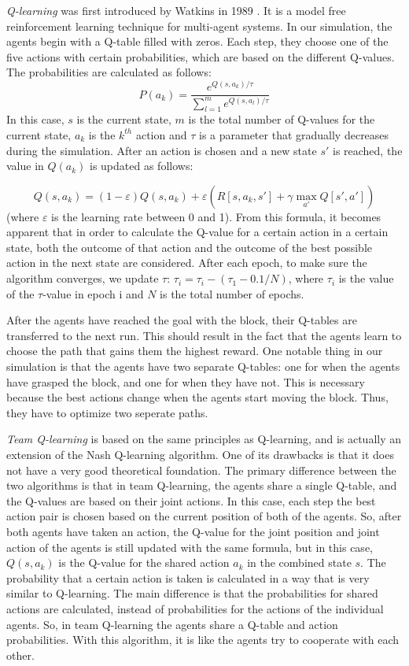 \textit{Q-learning} was first introduced by Watkins in 1989 \cite{watkins1989}. It is a model free reinforcement learning technique for multi-agent systems. In our simulation, the agents begin with a Q-table filled with zeros. Each step, they choose one of the five actions with certain probabilities, which are based on the different Q-values. The probabilities are calculated as follows: 
\begin{equation}
	P(a_{k})=\frac{e^{Q(s,a_{k})/ \tau}}{\sum_{l=1}^{m}e^{Q(s,a_{l})/ \tau}}
\end{equation}
In this case, $s$ is the current state, $m$ is the total number of Q-values for the current state, $a_{k}$ is the $k^{th}$ action and $\tau$ is a parameter that gradually decreases during the simulation. After an action is chosen and a new state $s'$ is reached, the value in $Q(a_{k})$ is updated as follows: 

\begin{equation}
	Q(s,a_{k}) = (1- \varepsilon) Q(s,a_{k})+ \varepsilon (R [s, a_k, s'] + \gamma \max_{a'} Q[s', a'])
\end{equation}
(where $\varepsilon$ is the learning rate between 0 and 1). From this formula, it becomes apparent that in order to calculate the Q-value for a certain action in a certain state, both the outcome of that action and the outcome of the best possible action in the next state are considered. After each epoch, to make sure the algorithm converges, we update $\tau$: $\tau_{i} = \tau_{i}-(\tau_{1}-0.1/N)$, where $\tau_{i}$ is the value of the $\tau$-value in epoch i and $N$ is the total number of epochs.

After the agents have reached the goal with the block, their Q-tables are transferred to the next run. This should result in the fact that the agents learn to choose the path that gains them the highest reward. One notable thing in our simulation is that the agents have two separate Q-tables: one for when the agents have grasped the block, and one for when they have not. This is necessary because the best actions change when the agents start moving the block. Thus, they have to optimize two seperate paths.

\textit{Team Q-learning} is based on the same principles as Q-learning, and is actually an extension of the Nash Q-learning algorithm. One of its drawbacks is that it does not have a very good theoretical foundation. The primary difference between the two algorithms is that in team Q-learning, the agents share a single Q-table, and the Q-values are based on their joint actions. In this case, each step the best action pair is chosen based on the current position of both of the agents. So, after both agents have taken an action, the Q-value for the joint position and joint action of the agents is still updated with the same formula, but in this case,  $Q(s,a_{k})$ is the Q-value for the shared action $a_{k}$ in the combined state $s$. The probability that a certain action is taken is calculated in a way that is very similar to Q-learning. The main difference is that the probabilities for shared actions are calculated, instead of probabilities for the actions of the individual agents. So, in team Q-learning the agents share a Q-table and action probabilities. With this algorithm, it is like the agents try to cooperate with each other.
